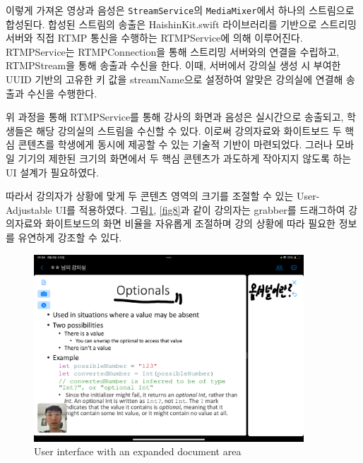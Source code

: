 \documentclass[pdflatex,sn-mathphys-num]{sn-jnl}%
\theoremstyle{thmstyleone}%
\theoremstyle{thmstyletwo}%
\theoremstyle{thmstylethree}%
\begin{document}
이렇게 가져온 영상과 음성은 \verb+StreamService+의 \verb+MediaMixer+에서 하나의 스트림으로 합성된다. 합성된 스트림의 송출은 HaishinKit.swift\cite{HaishinKit} 라이브러리를 기반으로 스트리밍 서버와 직접 RTMP 통신을 수행하는 RTMPService에 의해 이루어진다. RTMPService는 RTMPConnection을 통해 스트리밍 서버와의 연결을 수립하고, RTMPStream을 통해 송출과 수신을 한다. 이때, 서버에서 강의실 생성 시 부여한 UUID 기반의 고유한 키 값을 streamName으로 설정하여 알맞은 강의실에 연결해 송출과 수신을 수행한다.

위 과정을 통해 RTMPService를 통해 강사의 화면과 음성은 실시간으로 송출되고, 학생들은 해당 강의실의 스트림을 수신할 수 있다. 이로써 강의자료와 화이트보드 두 핵심 콘텐츠를 학생에게 동시에 제공할 수 있는 기술적 기반이 마련되었다. 그러나 모바일 기기의 제한된 크기의 화면에서 두 핵심 콘텐츠가 과도하게 작아지지 않도록 하는 UI 설계가 필요하였다.

따라서 강의자가 상황에 맞게 두 콘텐츠 영역의 크기를 조절할 수 있는 User-Adjustable UI를 적용하였다. 그림\ref{fig7}, \ref{fig8}과 같이 강의자는 grabber를 드래그하여 강의자료와 화이트보드의 화면 비율을 자유롭게 조절하며 강의 상황에 따라 필요한 정보를 유연하게 강조할 수 있다.

\begin{figure}[H]
\centering
\includegraphics[width=0.9\textwidth]{UserInterfaceWithAnExpandedDocumentArea.PNG}
\caption{User interface with an expanded document area}\label{fig7}
\end{figure}
\end{document}
